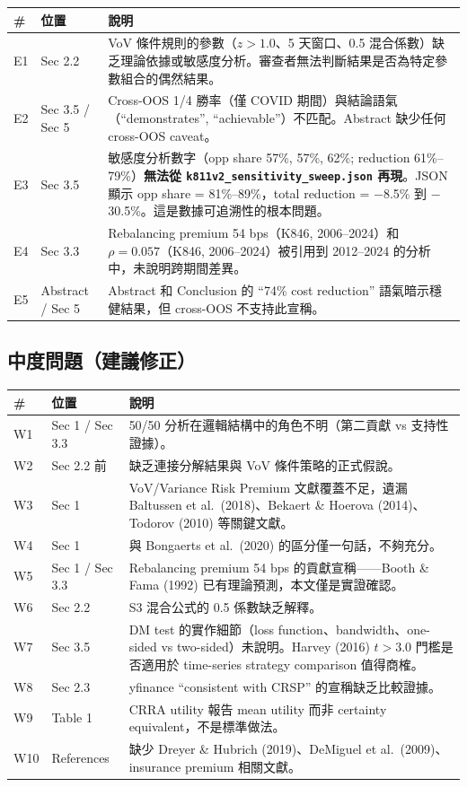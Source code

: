 \documentclass[12pt,a4paper]{article}
\begin{document}
\begin{longtable}{p{0.5cm}p{2.5cm}p{10.5cm}}
\toprule
\# & 位置 & 說明 \\
\midrule
E1 & Sec 2.2 & VoV 條件規則的參數（$z > 1.0$、5 天窗口、0.5 混合係數）缺乏理論依據或敏感度分析。審查者無法判斷結果是否為特定參數組合的偶然結果。 \\
\midrule
E2 & Sec 3.5 / Sec 5 & Cross-OOS 1/4 勝率（僅 COVID 期間）與結論語氣（``demonstrates'', ``achievable''）不匹配。Abstract 缺少任何 cross-OOS caveat。 \\
\midrule
E3 & Sec 3.5 & 敏感度分析數字（opp share 57\%, 57\%, 62\%; reduction 61\%--79\%）\textbf{無法從 \texttt{k811v2\_sensitivity\_sweep.json} 再現}。JSON 顯示 opp share = 81\%--89\%，total reduction = $-$8.5\% 到 $-$30.5\%。這是數據可追溯性的根本問題。 \\
\midrule
E4 & Sec 3.3 & Rebalancing premium 54 bps（K846, 2006--2024）和 $\rho = 0.057$（K846, 2006--2024）被引用到 2012--2024 的分析中，未說明跨期間差異。 \\
\midrule
E5 & Abstract / Sec 5 & Abstract 和 Conclusion 的 ``74\% cost reduction'' 語氣暗示穩健結果，但 cross-OOS 不支持此宣稱。 \\
\bottomrule
\end{longtable}

\subsection*{\textcolor{warncolor}{中度問題（建議修正）}}

\begin{longtable}{p{0.5cm}p{2.5cm}p{10.5cm}}
\toprule
\# & 位置 & 說明 \\
\midrule
W1 & Sec 1 / Sec 3.3 & 50/50 分析在邏輯結構中的角色不明（第二貢獻 vs 支持性證據）。 \\
\midrule
W2 & Sec 2.2 前 & 缺乏連接分解結果與 VoV 條件策略的正式假說。 \\
\midrule
W3 & Sec 1 & VoV/Variance Risk Premium 文獻覆蓋不足，遺漏 Baltussen et al.\ (2018)、Bekaert \& Hoerova (2014)、Todorov (2010) 等關鍵文獻。 \\
\midrule
W4 & Sec 1 & 與 Bongaerts et al.\ (2020) 的區分僅一句話，不夠充分。 \\
\midrule
W5 & Sec 1 / Sec 3.3 & Rebalancing premium 54 bps 的貢獻宣稱——Booth \& Fama (1992) 已有理論預測，本文僅是實證確認。 \\
\midrule
W6 & Sec 2.2 & S3 混合公式的 0.5 係數缺乏解釋。 \\
\midrule
W7 & Sec 3.5 & DM test 的實作細節（loss function、bandwidth、one-sided vs two-sided）未說明。Harvey (2016) $t > 3.0$ 門檻是否適用於 time-series strategy comparison 值得商榷。 \\
\midrule
W8 & Sec 2.3 & yfinance ``consistent with CRSP'' 的宣稱缺乏比較證據。 \\
\midrule
W9 & Table 1 & CRRA utility 報告 mean utility 而非 certainty equivalent，不是標準做法。 \\
\midrule
W10 & References & 缺少 Dreyer \& Hubrich (2019)、DeMiguel et al.\ (2009)、insurance premium 相關文獻。 \\
\bottomrule
\end{longtable}
\end{document}
